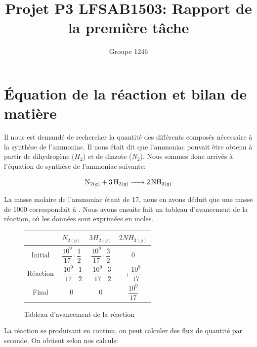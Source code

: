 \documentclass[11pt,a4paper]{report}
\author{Groupe 1246}
\title{Projet P3 LFSAB1503: Rapport de la première tâche}
\begin{document}
\maketitle

\section*{Équation de la réaction et bilan de matière}

Il nous est demandé de rechercher la quantité des différents composés nécessaire à la synthèse de l'ammoniac.
Il nous était dit que l'ammoniac pouvait être obtenu à partir de dihydrogène ($H_2$) et de diazote ($N_2$).
Nous sommes donc arrivés à l'équation de synthèse de l'ammoniac suivante: 


 $$\ce{N_{2(g)} + 3H_{2(g)} -> 2NH_{3(g)}}$$

La masse molaire de l'ammoniac étant de \unit{17}{\gram\per\mole}, nous en avons déduit que une masse de \unit{1000}{\ton}
correspondait à \unit{}{\mole}. Nous avons ensuite fait un tableau d'avancement de la réaction,
où les données sont exprimées en moles.

\begin{figure}[h]
\centering
\begin{tabular}{|c|c|c|c|}
\hline 
 & $N_{2(g)}$ & $3H_{2(g)} $ & $2NH_{3(g)}$ \\ 
\hline 
Initial & $\dfrac{10^{9}}{17} \cdot \dfrac{1}{2}$ & $\dfrac{10^{9}}{17} \cdot \dfrac{3}{2}$ & 0 \\ 
\hline 
Réaction & -$\dfrac{10^{9}}{17} \cdot \dfrac{1}{2}$ & -$\dfrac{10^{9}}{17} \cdot \dfrac{3}{2}$ & +$\dfrac{10^{9}}{17}$ \\ 
\hline 
Final & 0 & 0 & $\dfrac{10^{9}}{17}$ \\ 
\hline 
\end{tabular} 
\caption{Tableau d'avancement de la réaction}
\label{tableau}
\end{figure}

La réaction se produisant en continu, on peut calculer des flux de quantité par seconde.
On obtient selon nos calculs:

\begin{itemize}
  \item{une consommation de $N_2$ égale à: $\dfrac{10^{9}}{17} \cdot \dfrac{1}{2} \cdot \dfrac{1}{3600 \cdot 24} \cong 340.41 $ \unit{}{\mole\per\second}.}
  \item{une consommation de $H_2$ égale à: $\dfrac{10^{9}}{17} \cdot \dfrac{3}{2} \cdot \dfrac{1}{3600 \cdot 24} \cong 1021.241 $\unit{}{\mole\per\second}
  \item{une production de $NH_3$ égale à: $\dfrac{10^{9}}{17}} \cdot \dfrac{1}{3600 \cdot 24} \cong 680.827$ \unit{}{\mole\per\second}
}}\end{itemize}
\end{document}
